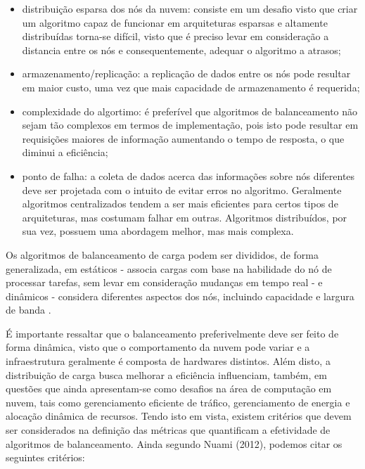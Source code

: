 \begin{itemize}
	\item distribuição esparsa dos nós da nuvem: consiste em um desafio visto que criar um algoritmo capaz de funcionar em arquiteturas esparsas e altamente distribuídas torna-se difícil, visto que é preciso levar em consideração a distancia entre os nós e consequentemente, adequar o algoritmo a atrasos; 
	
	\item armazenamento/replicação: a replicação de dados entre os nós pode resultar em maior custo, uma vez que mais capacidade de armazenamento é requerida;
	
	\item complexidade do algortimo: é preferível que algoritmos de balanceamento não sejam tão complexos em termos de implementação, pois isto pode resultar em requisições maiores de informação aumentando o tempo de resposta, o que diminui a eficiência; 
	
	\item ponto de falha: a coleta de dados acerca das informações sobre nós diferentes deve ser projetada com o intuito de evitar erros no algoritmo. Geralmente algoritmos centralizados tendem a ser mais eficientes para certos tipos de arquiteturas, mas costumam falhar em outras. Algoritmos distribuídos, por sua vez, possuem uma abordagem melhor, mas mais complexa.
\end{itemize}

Os algoritmos de balanceamento de carga podem ser divididos, de forma generalizada, em estáticos - associa cargas com base na habilidade do nó de processar tarefas, sem levar em consideração mudanças em tempo real - e dinâmicos - considera diferentes aspectos dos nós, incluindo capacidade e largura de banda \cite{nuaimi2012survey}. 

É importante ressaltar que o balanceamento preferivelmente deve ser feito de forma dinâmica, visto que o comportamento da nuvem pode variar e a infraestrutura geralmente é composta de hardwares distintos. Além disto, a distribuição de carga busca melhorar a eficiência influenciam, também, em questões que ainda apresentam-se como desafios na área de computação em nuvem, tais como gerenciamento eficiente de tráfico, gerenciamento de energia e alocação dinâmica de recursos\cite{zhang2010cloud}. Tendo isto em vista, existem critérios que devem ser considerados na definição das métricas que quantificam a efetividade de algoritmos de balanceamento. Ainda segundo Nuami (2012), podemos citar os seguintes critérios: 

